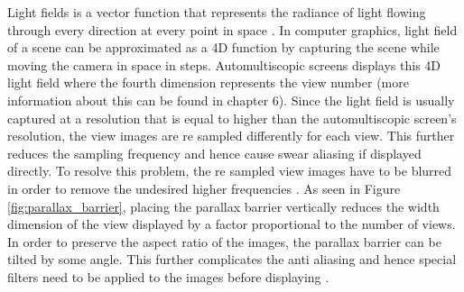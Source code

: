 Light fields is a vector function that represents the radiance of light flowing through every direction at every point in space \cite{ wiki:Light_field}. In computer graphics, light field of a scene can be approximated as a 4D function by capturing the scene while moving the camera in space in steps. Automultiscopic screens displays this 4D light field where the fourth dimension represents the view number (more information about this can be found in chapter 6). Since the light field is usually captured at a resolution that is equal to higher than the automultiscopic screen's resolution, the view images are re sampled differently for each view. This further reduces the sampling frequency and hence cause swear aliasing if displayed directly. To resolve this problem, the re sampled view images have to be blurred in order to remove the undesired higher frequencies \cite{zwicker2006antialiasing}. As seen in Figure \ref{fig:parallax_barrier}, placing the parallax barrier vertically reduces the width dimension of the view displayed by a factor proportional to the number of views. In order to preserve the aspect ratio of the images, the parallax barrier can be tilted by some angle. This further complicates the anti aliasing and hence special filters need to be applied to the images before displaying \cite{boev2007crosstalk}.

